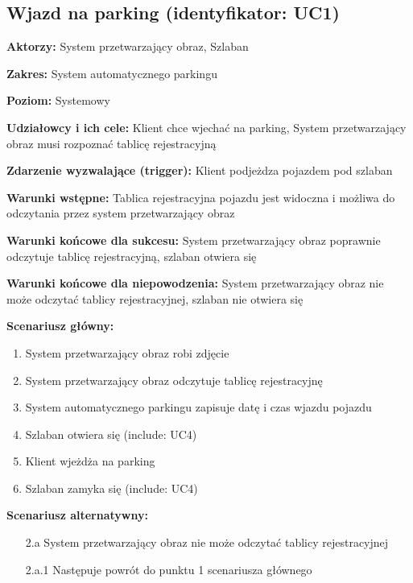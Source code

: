 \subsection{Wjazd na parking (identyfikator: UC1)}
\textbf{Aktorzy: }System przetwarzający obraz, Szlaban

\hspace{0cm}\textbf{Zakres: } System automatycznego parkingu

\hspace{0cm}\textbf{Poziom: } Systemowy

\hspace{0cm}\textbf{Udziałowcy i ich cele: } Klient chce wjechać na parking, System przetwarzający obraz musi rozpoznać tablicę rejestracyjną

\hspace{0cm}\textbf{Zdarzenie wyzwalające (trigger): } Klient podjeżdza pojazdem pod szlaban

\hspace{0cm}\textbf{Warunki wstępne: } Tablica rejestracyjna pojazdu jest widoczna i możliwa do odczytania przez system przetwarzający obraz

\hspace{0cm}\textbf{Warunki końcowe dla sukcesu: }
System przetwarzający obraz poprawnie odczytuje tablicę rejestracyjną, szlaban otwiera się

\hspace{0cm}\textbf{Warunki końcowe dla niepowodzenia: } System przetwarzający obraz nie może odczytać tablicy rejestracyjnej, szlaban nie otwiera się \newline

\hspace{0cm}\textbf{Scenariusz główny: }
\begin{enumerate}
\item System przetwarzający obraz robi zdjęcie
\item System przetwarzający obraz odczytuje tablicę rejestracyjnę
\item System automatycznego parkingu zapisuje datę i czas wjazdu pojazdu
\item Szlaban otwiera się (include: UC4)
\item Klient wjeżdża na parking
\item Szlaban zamyka się (include: UC4)
\end{enumerate}
\hspace{0cm}\textbf{Scenariusz alternatywny: }
\begin{enumerate}
\item[2.a] System przetwarzający obraz nie może odczytać tablicy rejestracyjnej
\item[2.a.1] Następuje powrót do punktu 1 scenariusza głównego
\end{enumerate}


